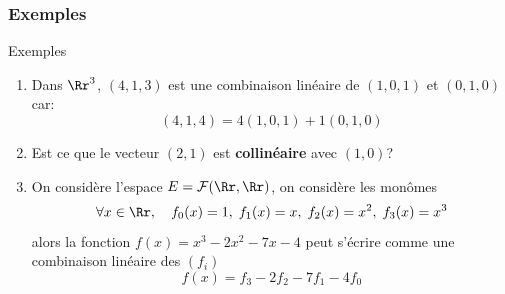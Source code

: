 \documentclass[dvipsnames]{beamer}
\begin{document}
\begin{frame}[t]
  \frametitle{Exemples}
 \begin{block}{Exemples}

   \begin{enumerate}
     \small
   \item Dans $\Rr^3$, $(4,1,3)$ est une combinaison linéaire de
     $(1,0,1)$ et $(0,1,0)$ car:
     $$
     (4,1,4) = 4(1,0,1) + 1(0,1,0)
     $$

   \item Est ce que le vecteur $(2,1)$ est \textbf{collinéaire}
     avec $(1,0)$?

   \item On considère l'espace $E=\mathcal{F}(\Rr,\Rr)$, on considère les
     monômes 
     \begin{equation*}
       \forall x\in \Rr,\quad f_0(x)=1,\;f_1(x)=x,\; f_2(x)=x^2,\;
       f_3(x)=x^3
     \end{equation*}
     alors la fonction $f(x) = x^3 -2x^2 -7x -4$ peut s'écrire comme
     une combinaison linéaire des $(f_i)$ 
     \begin{equation*}
       f(x) = f_3 -2f_2 - 7f_1 -4f_0
     \end{equation*}
   \end{enumerate}
 \end{block} 
\end{frame}
\end{document}
